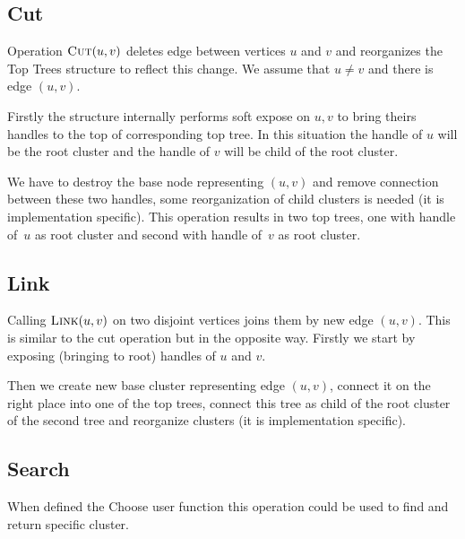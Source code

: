 \subsection{Cut}

Operation $\hbox{\sc Cut}(u,v)$ deletes edge between vertices $u$ and $v$ and reorganizes
the Top Trees structure to reflect this change. We assume that $u\ne v$ and
there is edge $(u,v)$.

Firstly the structure internally performs {\I soft expose} on $u,v$ to bring
theirs handles to the top of corresponding top tree. In this situation the
handle of $u$ will be the root cluster and the handle of $v$ will be child of
the root cluster.

We have to destroy the base node representing $(u,v)$ and remove connection
between these two handles, some reorganization of child clusters is needed (it
is implementation specific). This operation results in two top trees, one with
handle of~$u$ as root cluster and second with handle of~$v$ as root cluster.


\subsection{Link}

Calling $\hbox{\sc Link}(u,v)$ on two disjoint vertices joins them by new edge $(u,v)$.
This is similar to the cut operation but in the opposite way. Firstly we start
by {\I exposing} (bringing to root) handles of $u$ and $v$.

Then we create new base cluster representing edge $(u,v)$, connect it on the
right place into one of the top trees, connect this tree as child of the root
cluster of the second tree and reorganize clusters (it is implementation
specific).


\subsection{Search}

When defined the {\I Choose} user function this operation could be used to find
and return specific cluster.

